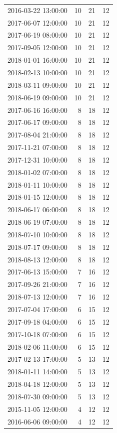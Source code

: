 \begin{tabular}{lrrr}
2016-03-22 13:00:00 & 10 & 21 & 12 \\
2017-06-07 12:00:00 & 10 & 21 & 12 \\
2017-06-19 08:00:00 & 10 & 21 & 12 \\
2017-09-05 12:00:00 & 10 & 21 & 12 \\
2018-01-01 16:00:00 & 10 & 21 & 12 \\
2018-02-13 10:00:00 & 10 & 21 & 12 \\
2018-03-11 09:00:00 & 10 & 21 & 12 \\
2018-06-19 09:00:00 & 10 & 21 & 12 \\
2017-06-16 16:00:00 & 8 & 18 & 12 \\
2017-06-17 09:00:00 & 8 & 18 & 12 \\
2017-08-04 21:00:00 & 8 & 18 & 12 \\
2017-11-21 07:00:00 & 8 & 18 & 12 \\
2017-12-31 10:00:00 & 8 & 18 & 12 \\
2018-01-02 07:00:00 & 8 & 18 & 12 \\
2018-01-11 10:00:00 & 8 & 18 & 12 \\
2018-01-15 12:00:00 & 8 & 18 & 12 \\
2018-06-17 06:00:00 & 8 & 18 & 12 \\
2018-06-19 07:00:00 & 8 & 18 & 12 \\
2018-07-10 10:00:00 & 8 & 18 & 12 \\
2018-07-17 09:00:00 & 8 & 18 & 12 \\
2018-08-13 12:00:00 & 8 & 18 & 12 \\
2017-06-13 15:00:00 & 7 & 16 & 12 \\
2017-09-26 21:00:00 & 7 & 16 & 12 \\
2018-07-13 12:00:00 & 7 & 16 & 12 \\
2017-07-04 17:00:00 & 6 & 15 & 12 \\
2017-09-18 04:00:00 & 6 & 15 & 12 \\
2017-10-18 07:00:00 & 6 & 15 & 12 \\
2018-02-06 11:00:00 & 6 & 15 & 12 \\
2017-02-13 17:00:00 & 5 & 13 & 12 \\
2018-01-11 14:00:00 & 5 & 13 & 12 \\
2018-04-18 12:00:00 & 5 & 13 & 12 \\
2018-07-30 09:00:00 & 5 & 13 & 12 \\
2015-11-05 12:00:00 & 4 & 12 & 12 \\
2016-06-06 09:00:00 & 4 & 12 & 12 \\

\end{tabular}
